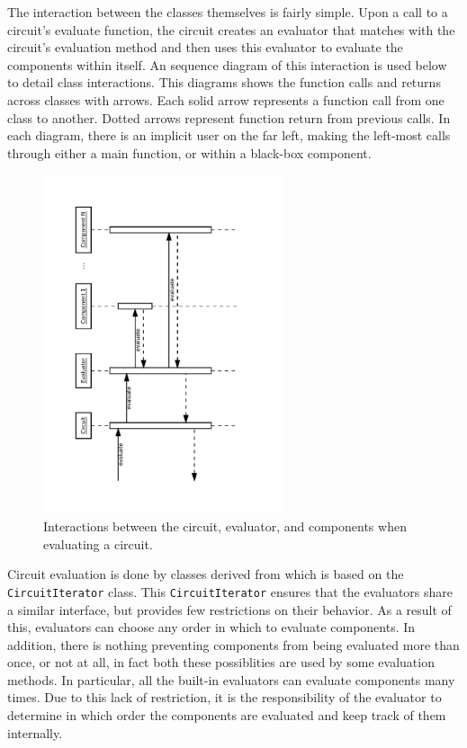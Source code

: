 \documentclass{article}
\newcommand{\ClassName}[1]{\texttt{#1}}
\begin{document}
The interaction between the classes themselves is fairly simple. Upon a call to a circuit's evaluate function, the circuit creates an evaluator that matches with the circuit’s evaluation method and then uses this evaluator to evaluate the components within itself. An sequence diagram of this interaction is used below to detail class interactions. This diagrams shows the function calls and returns across classes with arrows. Each solid arrow represents a function call from one class to another. Dotted arrows represent function return from previous calls. In each diagram, there is an implicit user on the far left, making the left-most calls through either a main function, or within a black-box component.

\begin{figure}[H]
    \begin{center}
        \includegraphics[angle=270,width=200pt]{imgs/CircuitEvaluationInteraction.pdf}
    \end{center}
    \caption{Interactions between the circuit, evaluator, and components when evaluating a circuit.}
\end{figure}

Circuit evaluation is done by classes derived from which is based on the \ClassName{CircuitIterator} class. This \ClassName{CircuitIterator} ensures that the evaluators share a similar interface, but provides few restrictions on their behavior. As a result of this, evaluators can choose any order in which to evaluate components. In addition, there is nothing preventing components from being evaluated more than once, or not at all, in fact both these possiblities are used by some evaluation methods. In particular, all the built-in evaluators can evaluate components many times. Due to this lack of restriction, it is the responsibility of the evaluator to determine in which order the components are evaluated and keep track of them internally.
\end{document}
